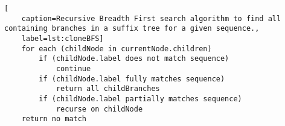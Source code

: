 
\begin{lstlisting}[
	caption=Recursive Breadth First search algorithm to find all containing branches in a suffix tree for a given sequence.,
	label=lst:cloneBFS] 
	for each (childNode in currentNode.children)
		if (childNode.label does not match sequence)
			continue
		if (childNode.label fully matches sequence)
			return all childBranches
		if (childNode.label partially matches sequence)
			recurse on childNode
	return no match
\end{lstlisting}